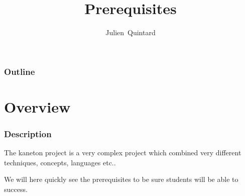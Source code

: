 
%
%



%
%

\title{Prerequisites}

%
%

\author
{
  Julien~Quintard
}

%
%



%
%

\begin{frame}
  \titlepage

  \begin{center}
    \logos
  \end{center}
\end{frame}

%
%

\begin{frame}
  \frametitle{Outline}
  \tableofcontents
\end{frame}

%
%

\section{Overview}


\begin{frame}
  \frametitle{Description}

  The kaneton project is a very complex project which combined very different
  techniques, concepts, languages etc..

  \nl

  We will here quickly see the prerequisites to be sure students will be
  able to success.
\end{frame}


